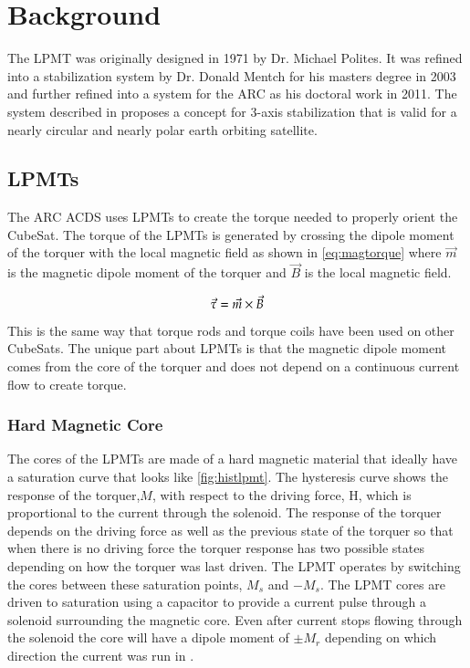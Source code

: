 

\chapter{Background}

\label{ch:BG}


The \ac{LPMT} was originally designed in 1971 by Dr. Michael Polites\cite{Polites71}. It was refined into a stabilization system by Dr. Donald Mentch for his masters degree in 2003 and further refined into a system for the \ac{ARC} as his doctoral work in 2011\cite{Mentch11}. The system described in \cite{Mentch11} proposes a concept for 3-axis stabilization that is valid for a nearly circular and nearly polar earth orbiting satellite.

\section{\aclp{LPMT}}

The \ac{ARC} \ac{ACDS} uses \acfp{LPMT} to create the torque needed to properly orient the CubeSat. The torque of the \acp{LPMT} is generated by crossing the dipole moment of the torquer with the local magnetic field as shown in \cref{eq:magtorque} where $\vec{m}$ is the magnetic dipole moment of the torquer and $\vec{B}$ is the local magnetic field.

\begin{equation}
    \vec{\tau} = \vec{m} \times \vec{B}
    \label{eq:magtorque}
\end{equation}

This is the same way that torque rods and torque coils have been used on other CubeSats. The unique part about \acp{LPMT} is that the magnetic dipole moment comes from the core of the torquer and does not depend on a continuous current flow to create torque.


\subsection{Hard Magnetic Core}

The cores of the \acp{LPMT} are made of a hard magnetic material that ideally have a saturation curve that looks like \cref{fig:histlpmt}. The hysteresis curve shows the response of the torquer,$M$, with respect to the driving force, H, which is proportional to the current through the solenoid. The response of the torquer depends on the driving force as well as the previous state of the torquer so that when there is no driving force the torquer response has two possible states depending on how the torquer was last driven. The \ac{LPMT} operates by switching the cores between these saturation points, $M_s$ and $-M_s$. The \ac{LPMT} cores are driven to saturation using a capacitor to provide a current pulse through a solenoid surrounding the magnetic core. Even after current stops flowing through the solenoid the core will have a dipole moment of $\pm M_r$ depending on which direction the current was run in \cite{Mentch11}.

